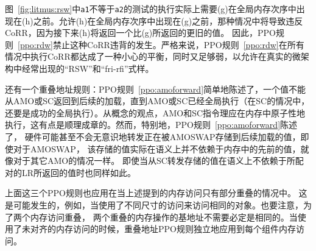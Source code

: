 图~\ref{fig:litmus:rsw}中{\tt a1}不等于{\tt a2}的测试的执行实际上需要(g)在全局内存次序中出现在(h)之前。允许(h)在全局内存次序中出现在(g)之前，那种情况中将导致违反CoRR，因为接下来(h)将返回一个比(g)所返回的更旧的值。
因此，PPO规则~\ref{ppo:rdw}禁止这种CoRR违背的发生。严格来说，PPO规则~\ref{ppo:rdw}在所有情况中执行CoRR都达成了一种小心的平衡，同时又足够弱，以允许在真实的微架构中经常出现的“RSW”和“fri-rfi”式样。

还有一个重叠地址规则：PPO规则~\ref{ppo:amoforward}简单地陈述了，一个值不能从AMO或SC返回到后续的加载，直到AMO或SC已经全局执行（在SC的情况中，
还要是成功的全局执行）。从概念的观点，AMO和SC指令理应在内存中原子性地执行，这有点是顺理成章的。然而，特别地，PPO规则~\ref{ppo:amoforward}陈述了，
硬件可能甚至不会无意识地转发正在被AMOSWAP存储到后续加载的值，即使对于AMOSWAP，
该存储的值实际在语义上并不依赖于内存中的先前的值，就像对于其它AMO的情况一样。
即使当从SC转发存储的值在语义上不依赖于所配对的LR所返回的值时也同样如此。

上面这三个PPO规则也应用在当上述提到的内存访问只有部分重叠的情况中。
这是可能发生的，例如，当使用了不同尺寸的访问来访问相同的对象。也要注意，为了两个内存访问重叠，
两个重叠的内存操作的基地址不需要必定是相同的。当使用了未对齐的内存访问的时候，重叠地址PPO规则独立地应用到每个组件内存访问。

